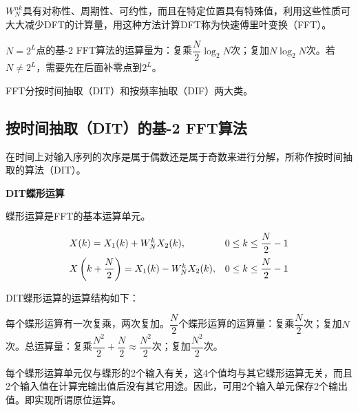 \documentclass[cn, hazy, blue, normal, 14pt]{elegantnote}
\begin{document}
$W_N^{nk}$具有对称性、周期性、可约性，而且在特定位置具有特殊值，利用这些性质可大大减少DFT的计算量，用这种方法计算DFT称为快速傅里叶变换（FFT）。

$N=2^L$点的基-2 FFT算法的运算量为：复乘$\dfrac{N}{2}\log_2 N$次；复加$N\log_2 N$次。若$N\neq2^L$，需要先在后面补零点到$2^L$。

FFT分按时间抽取（DIT）和按频率抽取（DIF）两大类。


\subsection{按时间抽取（DIT）的基-2 FFT算法}

在时间上对输入序列的次序是属于偶数还是属于奇数来进行分解，所称作按时间抽取的算法（DIT）。

\textbf{DIT蝶形运算}

蝶形运算是FFT的基本运算单元。

\begin{equation}
\begin{array}{ll}
    X(k)=X_1(k)+W_N^k X_2(k), & 0\leq k\leq \dfrac{N}{2}-1 \\
    \addlinespace
    X\left(k+\dfrac{N}{2}\right)=X_1(k)-W_N^k X_2(k), & 0\leq k\leq \dfrac{N}{2}-1
\end{array}
\end{equation}

DIT蝶形运算的运算结构如下：

\begin{center}
\end{center}

每个蝶形运算有一次复乘，两次复加。$\dfrac{N}{2}$个蝶形运算的运算量：复乘$\dfrac{N}{2}$次；复加$N$次。总运算量：复乘$\dfrac{N^2}{2}+\dfrac{N}{2}\approx \dfrac{N^2}{2}$次；复加$\dfrac{N^2}{2}$次。

每个蝶形运算单元仅与蝶形的2个输入有关，这4个值均与其它蝶形运算无关，而且2个输入值在计算完输出值后没有其它用途。因此，可用2个输入单元保存2个输出值。即实现所谓原位运算。
\end{document}
